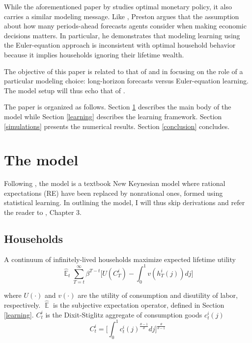\documentclass[11pt]{article}
\renewcommand{\[}{\begin{equation}}
\renewcommand{\]}{\end{equation}}
\DeclareMathOperator{\E}{\mathbb{E}}
\begin{document}
While the aforementioned paper by \cite{preston2005} studies optimal monetary policy, it also carries a similar modeling message. Like \cite{graham2011individual}, Preston argues that the assumption about how many periods-ahead forecasts agents consider when making economic decisions matters. In particular, he demonstrates that modeling learning using the Euler-equation approach is inconsistent with optimal household behavior because it implies households ignoring their lifetime wealth. 

The objective of this paper is related to that of \cite{graham2011individual} and \cite{preston2005} in focusing on the role of a particular modeling choice: long-horizon forecasts versus Euler-equation learning. The model setup will thus echo that of \cite{preston2005}. 

The paper is organized as follows. Section \ref{models} describes the main body of the model while Section \ref{learning} describes the learning framework. Section \ref{simulations} presents the numerical results. Section \ref{conclusion} concludes. 

\section{The model}\label{models}
Following \cite{preston2005}, the model is a textbook New Keynesian model where rational expectations (RE) have been replaced by nonrational ones, formed using statistical learning. In outlining the model, I will thus skip derivations and refer the reader to \cite{woodford2011interest}, Chapter 3.  
\subsection{Households}
A continuum of infinitely-lived households maximize expected lifetime utility
\begin{equation}
\hat{\E}_t\sum^{\infty}_{T=t}\beta^{T-t} \bigg[ U(C^i_T) - \int_0^1 v(h^i_T(j)) dj \bigg]
\label{lifetime_U}
\end{equation}

where $U(\cdot)$ and $v(\cdot)$ are the utility of consumption and disutility of labor, respectively. $\hat{\E}$ is the subjective expectation operator, defined in Section \ref{learning}. $C^i_t$ is the Dixit-Stiglitz aggregate of consumption goods $c^i_t(j)$
\begin{equation}
C^i_t =  \bigg[  \int_0^1 c^i_t(j)^{\frac{\theta-1}{\theta}} dj \bigg]^{\frac{\theta}{\theta-1}}\label{dixit}
\end{equation}
\end{document}

